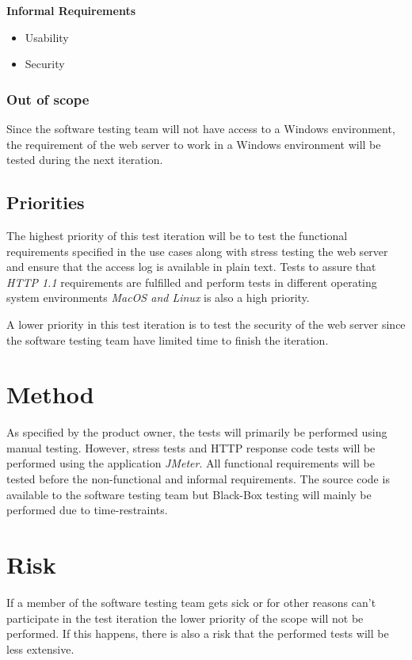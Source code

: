 \documentclass[a4paper, 12pt]{article}
\begin{document}
\textbf{Informal Requirements}
\begin{itemize}
\item Usability
\item Security
\end{itemize}

\subsubsection{Out of scope}
Since the software testing team will not have access to a Windows environment, the requirement of the web server to work in a Windows environment will be tested during the next iteration.

\subsection{Priorities}
The highest priority of this test iteration will be to test the functional requirements specified in the use cases along with stress testing the web server and ensure that the access log is available in plain text. Tests to assure that  \textit{HTTP 1.1} requirements are fulfilled and perform tests in different operating system environments \textit{MacOS and Linux} is also a high priority.

A lower priority in this test iteration is to test the security of the web server since the software testing team have limited time to finish the iteration.

\section{Method}
As specified by the product owner, the tests will primarily be performed using manual testing. However, stress tests and HTTP response code tests will be performed using the application \textit{JMeter}. All functional requirements will be tested before the non-functional and informal requirements. The source code is available to the software testing team but Black-Box testing will mainly be performed due to time-restraints.

\section{Risk}
If a member of the software testing team gets sick or for other reasons can't participate in the test iteration the lower priority of the scope will not be performed. If this happens, there is also a risk that the performed tests will be less extensive. 
\end{document}
